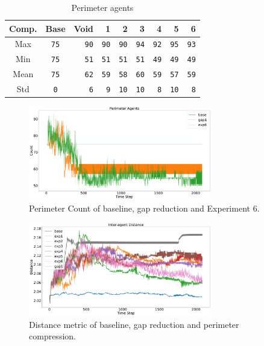 \documentclass[12pt,a4paper]{IEEEtran}
\begin{document}
\begin{table}[h]
	\centering
	\tiny
	\begin{tabular}{|c|c|r|r|r|r|r|r|r|}
		\hline
		\rowcolor[HTML]{000000} 
		{\color[HTML]{FFFFFF} Comp.} &{\color[HTML]{FFFFFF} Base} & {\color[HTML]{FFFFFF} Void} & {\color[HTML]{FFFFFF} 1} & {\color[HTML]{FFFFFF} 2} & {\color[HTML]{FFFFFF} 3} & {\color[HTML]{FFFFFF} 4} & {\color[HTML]{FFFFFF} 5} & {\color[HTML]{FFFFFF} 6}\\ \hline
		Max & \texttt{75} & \texttt{90} &\texttt{90} & \texttt{90} & \texttt{94} & \texttt{92} & \texttt{95} & \texttt{93} \\ \hline
		Min & \texttt{75} & \texttt{51} &\texttt{51}  & \texttt{51} & \texttt{51} & \texttt{49} & \texttt{49} & \texttt{49}\\ \hline
		Mean & \texttt{75} & \texttt{62} &\texttt{59}  & \texttt{58} & \texttt{60} & \texttt{59} & \texttt{57} & \texttt{59}\\ \hline
		Std & \texttt{0} & \texttt{6} &\texttt{9}  & \texttt{10} & \texttt{10} & \texttt{8} & \texttt{10} & \texttt{8}\\ \hline
	\end{tabular}
	\caption{Perimeter agents}
	\label{tab:perimeterLimits}
\end{table}

\begin{figure}[H]
	\begin{center}
		\includegraphics[width=8cm]{figures/PerimeterCount2}
	\end{center}
	\caption{Perimeter Count of baseline, gap reduction and Experiment 6. \label{fig:perimeterCount2}}
\end{figure}

\begin{figure}[H]
	\begin{center}
		\includegraphics[width=8cm]{figures/DistanceMetric1}
	\end{center}
	\caption{Distance metric of baseline, gap reduction and perimeter compression. \label{fig:distanceMetric}}
\end{figure}
\end{document}
